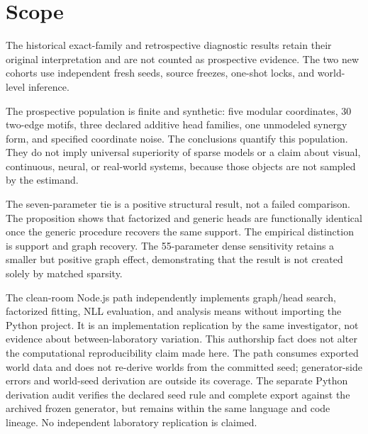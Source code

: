 \section{Scope}

The historical exact-family and retrospective diagnostic results retain their
original interpretation and are not counted as prospective evidence.  The two
new cohorts use independent fresh seeds, source freezes, one-shot locks, and
world-level inference.

The prospective population is finite and synthetic: five modular coordinates,
30 two-edge motifs, three declared additive head families, one unmodeled
synergy form, and specified coordinate noise.  The conclusions quantify this
population.  They do not imply universal superiority of sparse models or a
claim about visual, continuous, neural, or real-world systems, because those
objects are not sampled by the estimand.

The seven-parameter tie is a positive structural result, not a failed
comparison.  The proposition shows that factorized and generic heads are
functionally identical once the generic procedure recovers the same support.
The empirical distinction is support and graph recovery.  The 55-parameter
dense sensitivity retains a smaller but positive graph effect, demonstrating
that the result is not created solely by matched sparsity.

The clean-room Node.js path independently implements graph/head search,
factorized fitting, NLL evaluation, and analysis means without importing the
Python project.  It is an implementation replication by the same investigator,
not evidence about between-laboratory variation.  This authorship fact does not
alter the computational reproducibility claim made here.  The path consumes
exported world data and does not re-derive worlds from the committed seed;
generator-side errors and world-seed derivation are outside its coverage.  The
separate Python derivation audit verifies the declared seed rule and complete
export against the archived frozen generator, but remains within the same
language and code lineage.  No independent laboratory replication is claimed.
